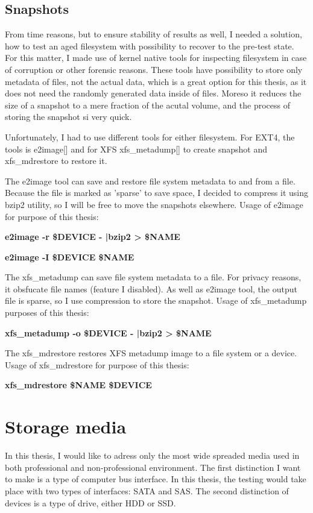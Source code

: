 \documentclass[
  color, %
  table, %
  lof,   %
  lot,   %
]{fithesis3}
\begin{document}
\section{Snapshots}
From time reasons, but to ensure stability of results as well, I needed a solution, how to test an aged filesystem with possibility to recover to the pre-test state. For this matter, I made use of kernel native tools for inspecting filesystem in case of corruption or other forensic reasons. These tools have possibility to store only metadata of files, not the actual data, which is a great option for this thesis, as it does not need the randomly generated data inside of files. Moreso it reduces the size of a snapshot to a mere fraction of the acutal volume, and the process of storing the snapshot si very quick.

Unfortunately, I had to use different tools for either filesystem. For EXT4, the tools is e2image[] and for XFS xfs\_metadump[] to create snapshot and xfs\_mdrestore to restore it.

The e2image tool can save and restore file system metadata to and from a file. Because the file is marked as 'sparse' to save space, I decided to compress it using bzip2 utility, so I will be free to move the snapshots elsewhere. Usage of e2image for purpose of this thesis:

\textbf{e2image -r \$DEVICE - |bzip2 > \$NAME}

\textbf{e2image -I \$DEVICE \$NAME}

The xfs\_metadump can save file system metadata to a file. For privacy reasons, it obsfucate file names (feature I disabled). As well as e2image tool, the output file is sparse, so I use compression to store the snapshot. Usage of xfs\_metadump purposes of this thesis:

\textbf{xfs\_metadump -o \$DEVICE - |bzip2 > \$NAME}

The xfs\_mdrestore restores XFS metadump image to a file system or a device. Usage of xfs\_mdrestore for purpose of this thesis: 

\textbf{xfs\_mdrestore \$NAME \$DEVICE}

\chapter{Storage media}
In this thesis, I would like to adress only the most wide spreaded media used in both professional and non-professional environment. The first distinction I want to make is a type of computer bus interface. In this thesis, the testing would take place with two types of interfaces: SATA and SAS. The second distinction of devices is a type of drive, either HDD or SSD.
\end{document}
